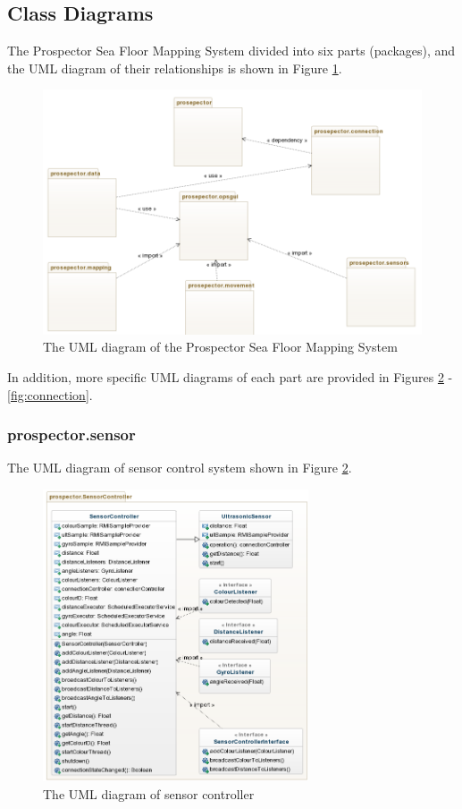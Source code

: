 \documentclass[12pt]{article}
\begin{document}
\subsection{Class Diagrams}\label{uml}
The Prospector Sea Floor Mapping System divided into six parts (packages), and the UML diagram of their relationships is shown in Figure \ref{fig:Total}.
 \begin{figure}[!htb]
\includegraphics[width=\textwidth]{Total.png}
\caption{The UML diagram of the Prospector Sea Floor Mapping System }
  \label{fig:Total}
\end{figure}
In addition, more specific UML diagrams of each part are provided in Figures \ref{fig:SensorController} - \ref{fig:connection}.
\subsubsection{prospector.sensor} The UML diagram of sensor control system shown in Figure \ref{fig:SensorController}.
 \begin{figure}[!htb]
\centering\includegraphics[width=0.7\textwidth]{SensorController.png}
\caption{The UML diagram of sensor controller }
  \label{fig:SensorController}
\end{figure}
\end{document}
